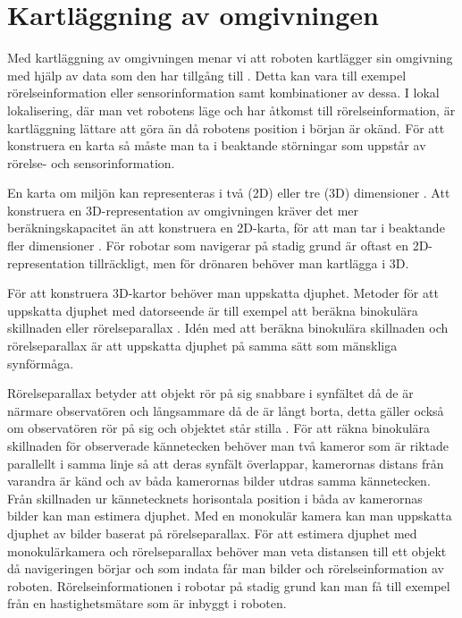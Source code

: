 \section{Kartläggning av omgivningen} \label{kartlaggning}

Med kartläggning av omgivningen menar vi att roboten kartlägger sin omgivning med hjälp av data som den har tillgång till \citep{ProbabilisticRobotics}. Detta kan vara till exempel rörelseinformation eller sensorinformation samt kombinationer av dessa. I lokal lokalisering, där man vet robotens läge och har åtkomst till rörelseinformation, är kartläggning lättare att göra än då robotens position i början är okänd. För att konstruera en karta så måste man ta i beaktande störningar som uppstår av rörelse- och sensorinformation.

En karta om miljön kan representeras i två (2D) eller tre (3D) dimensioner \citep{geospatial}. Att konstruera en 3D-representation av omgivningen kräver det mer beräkningskapacitet än att konstruera en 2D-karta, för att man tar i beaktande fler dimensioner \citep{ProbabilisticRobotics}. För robotar som navigerar på stadig grund är oftast en 2D-representation tillräckligt, men för drönaren behöver man kartlägga i 3D. 

För att konstruera 3D-kartor behöver man uppskatta djuphet. Metoder för att uppskatta djuphet med datorseende är till exempel att beräkna binokulära skillnaden eller rörelseparallax \citep{suomimainittu}. Idén med att beräkna binokulära skillnaden och rörelseparallax är att uppskatta djuphet på samma sätt som mänskliga synförmåga.

Rörelseparallax betyder att objekt rör på sig snabbare i synfältet då de är närmare observatören och långsammare då de är långt borta, detta gäller också om observatören rör på sig och objektet står stilla \citep{suomimainittu, parallax}. För att räkna binokulära skillnaden för observerade kännetecken behöver man två kameror som är riktade parallellt i samma linje så att deras synfält överlappar, kamerornas distans från varandra är känd och av båda kamerornas bilder utdras samma kännetecken. Från skillnaden ur kännetecknets horisontala position i båda av kamerornas bilder kan man estimera djuphet. Med en monokulär kamera kan man uppskatta djuphet av bilder baserat på rörelseparallax. För att estimera djuphet med monokulärkamera och rörelseparallax behöver man veta distansen till ett objekt då navigeringen börjar och som indata får man bilder och rörelseinformation av roboten. Rörelseinformationen i robotar på stadig grund kan man få till exempel från en hastighetsmätare som är inbyggt i roboten.

